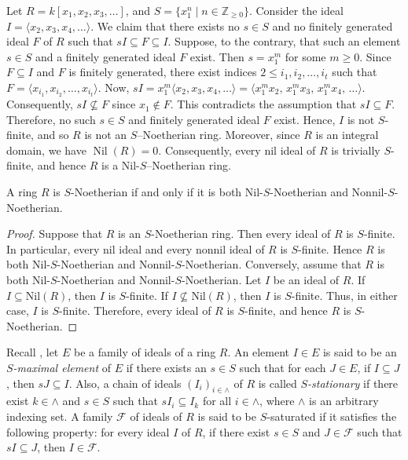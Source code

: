 \documentclass[11pt]{article}
\begin{document}
\begin{eg}\label{n13}
	Let $R = k[x_1, x_2, x_3,\ldots]$, and $S=\{x_1^n \mid n\in \mathbb{Z}_{\ge 0}\}$. Consider the ideal
	$I=\langle x_2,x_3,x_4,\ldots \rangle$. We claim that there exists no $s\in S$ and no finitely generated ideal $F$ of $R$ such that $sI \subseteq F \subseteq I$.
	Suppose, to the contrary, that such an element $s\in S$ and a finitely generated ideal $F$ exist. Then $s=x_1^m$ for some $m\ge 0$. Since $F\subseteq I$ and $F$ is finitely generated, there exist indices $2\le i_1,i_2,\ldots,i_t$ such that $F=\langle  x_{i_1},x_{i_2},\ldots,x_{i_t} \rangle$. Now, $sI = x_1^m  \langle x_2,x_3,x_4,\ldots \rangle= \langle x_1^m x_2,\, x_1^m x_3,\, x_1^m x_4,\, \ldots \rangle$. Consequently, $sI\nsubseteq F$ since $x_{1}\notin F$. This contradicts the assumption that $sI\subseteq F$. Therefore, no such $s\in S$ and finitely generated ideal $F$ exist. Hence, $I$ is not $S$-finite, and so $R$ is not an $S$--Noetherian ring. Moreover, since $R$ is an integral domain, we have $\operatorname{Nil}(R)=0$. Consequently, every nil ideal of $R$ is trivially $S$-finite, and hence $R$ is a Nil-$S$--Noetherian ring.
\end{eg}



\begin{prop}
	A ring $R$ is $S$-Noetherian if and only if it is both Nil-$S$-Noetherian and Nonnil-$S$-Noetherian.
\end{prop}

\begin{proof}
	Suppose that $R$ is an $S$-Noetherian ring. Then every ideal of $R$ is $S$-finite. In particular, every nil ideal and every nonnil ideal of $R$ is $S$-finite. Hence $R$ is both Nil-$S$-Noetherian and Nonnil-$S$-Noetherian.
	Conversely, assume that $R$ is both Nil-$S$-Noetherian and Nonnil-$S$-Noetherian. Let $I$ be an ideal of $R$. If $I \subseteq \mathrm{Nil}(R)$, then $I$ is $S$-finite. If $I \nsubseteq \mathrm{Nil}(R)$, then $I$ is $S$-finite. Thus, in either case, $I$ is $S$-finite. Therefore, every ideal of $R$ is $S$-finite, and hence $R$ is $S$-Noetherian.
\end{proof}

Recall \cite{zb17}, let $E$ be a family of ideals of a ring $R$. An element $I\in E$ is said to be an \textit{$S$-maximal element} of $E$ if there exists an $s\in S$ such that for each $J\in E$, if $I\subseteq J$, then $sJ\subseteq I$. Also, a chain of ideals $(I_{i})_{i\in\wedge}$  of $R$ is called \textit{$S$-stationary} if there exist $k\in \wedge$ and $s\in S$ such that  $sI_{i}\subseteq I_{k}$ for all $i\in\wedge$, where $\wedge$ is an arbitrary indexing set.  A family $\mathcal{F}$ of ideals of $R$ is said to be $S$-saturated if it satisfies the following property: for every ideal $I$ of $R$, if there exist $s\in S$ and $J\in\mathcal{F}$ such that $sI\subseteq J$, then $I\in\mathcal{F}$.
\end{document}
